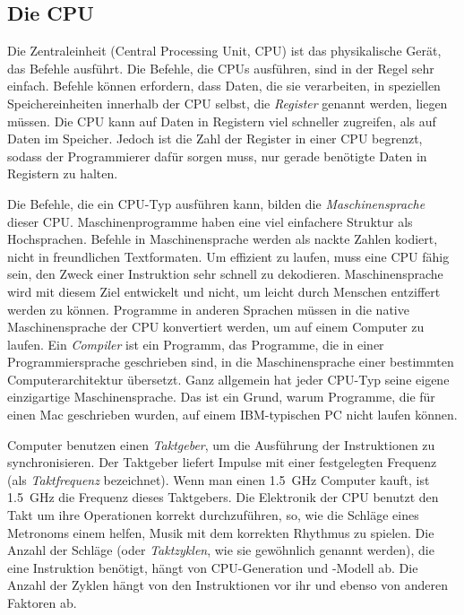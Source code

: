 \subsection{Die CPU}

Die Zentraleinheit (Central Processing Unit, CPU) ist das
physikalische Ger\"{a}t, das Befehle ausf\"{u}hrt. Die Befehle, die CPUs
ausf\"{u}hren, sind in der Regel sehr einfach. Befehle k\"{o}nnen erfordern,
dass Daten, die sie verarbeiten, in speziellen Speichereinheiten
innerhalb der CPU selbst, die \emph{Register} 
genannt werden, liegen m\"{u}ssen. Die CPU kann auf Daten in Registern
viel schneller zugreifen, als auf Daten im Speicher. Jedoch ist die
Zahl der Register in einer CPU begrenzt, sodass der Programmierer
daf\"{u}r sorgen muss, nur gerade ben\"{o}tigte Daten in Registern zu
halten.

Die Befehle, die ein CPU-Typ ausf\"{u}hren kann, bilden die
\emph{Maschinensprache}  dieser CPU\@.
Maschinenprogramme haben eine viel einfachere Struktur als
Hochsprachen. Befehle in Maschinensprache werden als nackte Zahlen
kodiert, nicht in freundlichen Textformaten. Um effizient zu laufen,
muss eine CPU f\"{a}hig sein, den Zweck einer Instruktion sehr schnell
zu dekodieren. Maschinensprache wird mit diesem Ziel entwickelt und
nicht, um leicht durch Menschen entziffert werden zu k\"{o}nnen.
Programme in anderen Sprachen m\"{u}ssen in die native Maschinensprache
der CPU konvertiert werden, um auf einem Computer zu laufen. Ein
\emph{Compiler}  ist ein Programm, das Programme,
die in einer Programmiersprache geschrieben sind, in die
Maschinensprache einer bestimmten Computerarchitektur \"{u}bersetzt.
Ganz allgemein hat jeder CPU-Typ seine eigene einzigartige
Maschinensprache. Das ist ein Grund, warum Programme, die f\"{u}r einen
Mac geschrieben wurden, auf einem IBM-typischen PC nicht laufen
k\"{o}nnen.

Computer benutzen einen \emph{Taktgeber},  um die
Ausf\"{u}hrung der Instruktionen zu synchronisieren.  Der Taktgeber liefert Impulse mit einer festgelegten
Frequenz (als \emph{Taktfrequenz} bezeichnet). Wenn man einen
1.5~GHz Computer kauft, ist 1.5~GHz die Frequenz dieses Taktgebers.
Die Elektronik der CPU benutzt den Takt um ihre Operationen korrekt
durchzuf\"{u}hren, so, wie die Schl\"{a}ge eines Metronoms einem helfen,
Musik mit dem korrekten Rhythmus zu spielen. Die Anzahl der Schl\"{a}ge
(oder \emph{Taktzyklen}, wie sie gew\"{o}hnlich genannt werden), die
eine Instruktion ben\"{o}tigt, h\"{a}ngt von CPU-Generation und -Modell ab.
Die Anzahl der Zyklen h\"{a}ngt von den Instruktionen vor ihr und ebenso
von anderen Faktoren ab.


